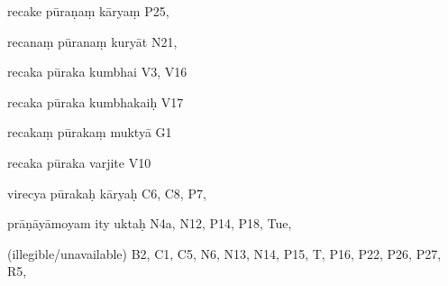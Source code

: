 \begin{marma}[hp02_009]
\begin{marma}[hp02_011]
\begin{marma}[hp02_73a]
\item[recake pūraṇaṃ kāryaṃ] P25,
\item[recanaṃ pūranaṃ kuryāt] N21,
\item[recaka pūraka kumbhai] V3, V16
\item[recaka pūraka kumbhakaiḥ] V17
\item[recakaṃ pūrakaṃ muktyā] G1
\item[recaka pūraka varjite] V10
\item[virecya pūrakaḥ kāryaḥ] C6, C8, P7,
\item[prāṇāyāmoyam ity uktaḥ] N4a, N12, P14, P18, Tue,
\item[(illegible/unavailable)] B2, C1, C5, N6, N13, N14, P15, T, P16, P22, P26, P27, R5,
  \begin{description}

    \end{description}
 \end{marma}


\end{marma}
\end{marma}
